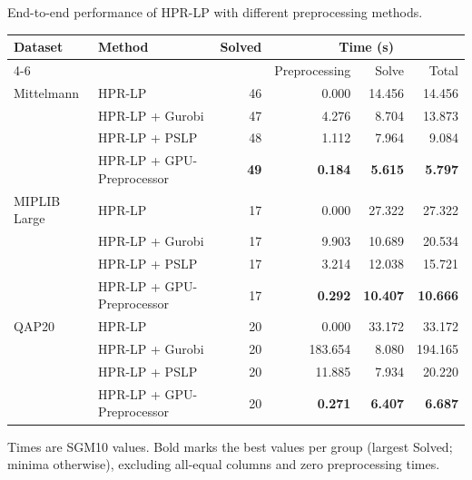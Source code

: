 \begin{table}[htbp]
\TABLE
{End-to-end performance of HPR-LP with different
preprocessing methods.\label{tab:end-to-end-performance}}
{\begin{tabularx}{\linewidth}{@{}l>{\raggedright\arraybackslash}Xrrrr@{}}
\toprule
Dataset & Method & Solved & \multicolumn{3}{c}{Time (s)} \\
\cmidrule(lr){4-6}
& & & Preprocessing & Solve & Total \\
\midrule
Mittelmann & HPR-LP
& 46 & 0.000 & 14.456 & 14.456 \\
& HPR-LP + Gurobi
& 47 & 4.276 & 8.704 & 13.873 \\
& HPR-LP + PSLP
& 48 & 1.112 & 7.964 & 9.084 \\
& HPR-LP + GPU-Preprocessor
& \textbf{49} & \textbf{0.184} & \textbf{5.615} & \textbf{5.797} \\
\midrule
MIPLIB Large & HPR-LP
& 17 & 0.000 & 27.322 & 27.322 \\
& HPR-LP + Gurobi
& 17 & 9.903 & 10.689 & 20.534 \\
& HPR-LP + PSLP
& 17 & 3.214 & 12.038 & 15.721 \\
& HPR-LP + GPU-Preprocessor
& 17 & \textbf{0.292} & \textbf{10.407} & \textbf{10.666} \\
\midrule
QAP20 & HPR-LP
& 20 & 0.000 & 33.172 & 33.172 \\
& HPR-LP + Gurobi
& 20 & 183.654 & 8.080 & 194.165 \\
& HPR-LP + PSLP
& 20 & 11.885 & 7.934 & 20.220 \\
& HPR-LP + GPU-Preprocessor
& 20 & \textbf{0.271} & \textbf{6.407} & \textbf{6.687} \\
\bottomrule
\end{tabularx}}
{Times are SGM10 values. Bold marks the best values per group
(largest Solved; minima otherwise), excluding all-equal columns and zero
preprocessing times.}
\end{table}
